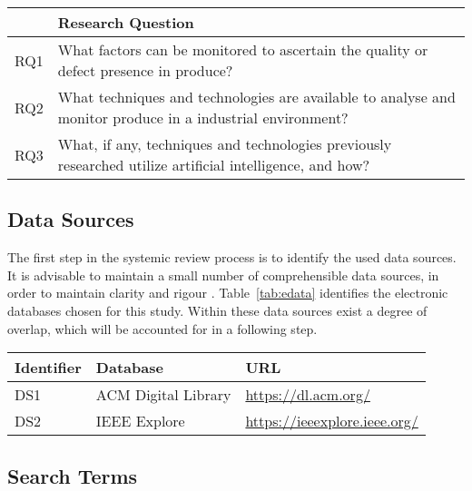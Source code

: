 \documentclass[conference]{IEEEtran}
\begin{document}
\begin{table*}
    \caption{Research Questions}
    \label{tab:resquest}

    \begin{tabular}{ll}
    \hline
        & \textbf{Research Question}\\
    \hline
        RQ1 & What factors can be monitored to ascertain the quality or defect presence in produce? \\
        RQ2 &  What techniques and technologies are available to analyse and monitor produce in a industrial environment?\\
        RQ3 & What, if any, techniques and technologies previously researched utilize artificial intelligence, and how? \\
    \hline
    \end{tabular}
\end{table*}

\subsection{Data Sources}

The first step in the systemic review process is to identify the used data sources. It is advisable
to maintain a small number of comprehensible data sources, in order to maintain clarity and rigour \cite{Par2015}. Table~\ref{tab:edata} identifies the electronic databases chosen for this study. Within these data sources exist a degree of overlap, which will be accounted for in a following step.

\begin{table*}
    \caption{Electronic databases}
    \label{tab:edata}
    \centering

    \begin{tabular}{lll}
    \hline
        Identifier & Database & URL \\
    \hline
        DS1 & ACM Digital Library & \url{https://dl.acm.org/} \\
        DS2 & IEEE Explore & \url{https://ieeexplore.ieee.org/} \\
    \hline

    \hline
    \end{tabular}
\end{table*}

\subsection{Search Terms}
\end{document}
